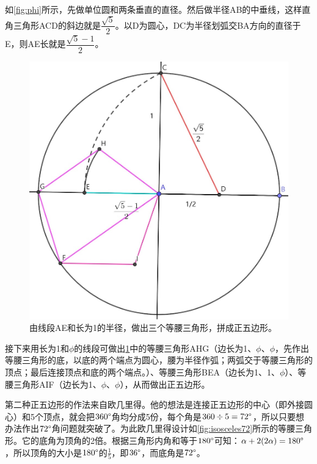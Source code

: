 \documentclass[b5paper]{ctexart}
\begin{document}
如\cref{fig:phi}所示，先做单位圆和两条垂直的直径。然后做半径AB的中垂线，这样直角三角形ACD的斜边就是$\dfrac{\sqrt{5}}{2}$。以D为圆心，DC为半径划弧交BA方向的直径于E，则AE长就是$\dfrac{\sqrt{5} - 1}{2}$。

\begin{figure}[htbp]
 \centering
 \includegraphics[scale=0.35]{img/pentagon-phi}
 \caption{由线段AE和长为1的半径，做出三个等腰三角形，拼成正五边形。}
 \label{fig:pentagon-phi}
\end{figure}

接下来用长为1和$\phi$的线段可做出\cref{fig:pentagon-phi}中的等腰三角形AHG（边长为1、$\phi$、$\phi$，先作出等腰三角形的底，以底的两个端点为圆心，腰为半径作弧；两弧交于等腰三角形的顶点；最后连接顶点和底的两个端点。）、等腰三角形BEA（边长为1、1、$\phi$）、等腰三角形AIF（边长为1、$\phi$、$\phi$），从而做出正五边形。

第二种正五边形的作法来自欧几里得。他的想法是连接正五边形的中心（即外接圆心）和5个顶点，就会把$360\degree$角均分成5份，每个角是$360 \div 5 = 72\degree$，所以只要想办法作出$72\degree$角问题就突破了。为此欧几里得设计如\cref{fig:isosceles72}所示的等腰三角形。它的底角为顶角的2倍。根据三角形内角和等于$180\degree$可知：$\alpha + 2(2\alpha) = 180\degree$，所以顶角的大小是$180\degree$的$\frac{1}{5}$，即$36\degree$，而底角是$72\degree$。
\end{document}
